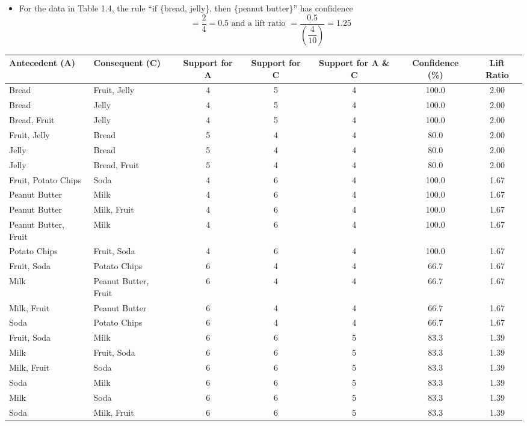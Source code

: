 \documentclass{report}
\begin{document}
\bigbreak \noindent
\begin{itemize}
  \item For the data in Table 1.4, the rule ``if \{bread, jelly\}, then \{peanut butter\}'' has confidence
    $$ = \dfrac{2}{4} = 0.5 \text{ and a lift ratio } = \dfrac{0.5}{\left(\dfrac{4}{10}\right)} = 1.25$$
\end{itemize}
\begin{table}[htbp]
  \hspace{-15mm} \begin{tabular}{llccccc}
    \toprule
    Antecedent (A) & Consequent (C) & Support for A & Support for C & Support for A \& C & Confidence (\%) & Lift Ratio \\
    \midrule
    Bread & Fruit, Jelly & 4 & 5 & 4 & 100.0 & 2.00 \\
    Bread & Jelly & 4 & 5 & 4 & 100.0 & 2.00 \\
    Bread, Fruit & Jelly & 4 & 5 & 4 & 100.0 & 2.00 \\
    Fruit, Jelly & Bread & 5 & 4 & 4 & 80.0 & 2.00 \\
    Jelly & Bread & 5 & 4 & 4 & 80.0 & 2.00 \\
    Jelly & Bread, Fruit & 5 & 4 & 4 & 80.0 & 2.00 \\
    Fruit, Potato Chips & Soda & 4 & 6 & 4 & 100.0 & 1.67 \\
    Peanut Butter & Milk & 4 & 6 & 4 & 100.0 & 1.67 \\
    Peanut Butter & Milk, Fruit & 4 & 6 & 4 & 100.0 & 1.67 \\
    \addlinespace %
    Peanut Butter, Fruit & Milk & 4 & 6 & 4 & 100.0 & 1.67 \\
    Potato Chips & Fruit, Soda & 4 & 6 & 4 & 100.0 & 1.67 \\
    Fruit, Soda & Potato Chips & 6 & 4 & 4 & 66.7 & 1.67 \\
    Milk & Peanut Butter, Fruit & 6 & 4 & 4 & 66.7 & 1.67 \\
    Milk, Fruit & Peanut Butter & 6 & 4 & 4 & 66.7 & 1.67 \\
    \addlinespace %
    Soda & Potato Chips & 6 & 4 & 4 & 66.7 & 1.67 \\
    Fruit, Soda & Milk & 6 & 6 & 5 & 83.3 & 1.39 \\
    Milk & Fruit, Soda & 6 & 6 & 5 & 83.3 & 1.39 \\
    Milk, Fruit & Soda & 6 & 6 & 5 & 83.3 & 1.39 \\
    Soda & Milk & 6 & 6 & 5 & 83.3 & 1.39 \\
    Milk & Soda & 6 & 6 & 5 & 83.3 & 1.39 \\
    Soda & Milk, Fruit & 6 & 6 & 5 & 83.3 & 1.39 \\
    \bottomrule
  \end{tabular}
\end{table}
\newpage
\end{document}
